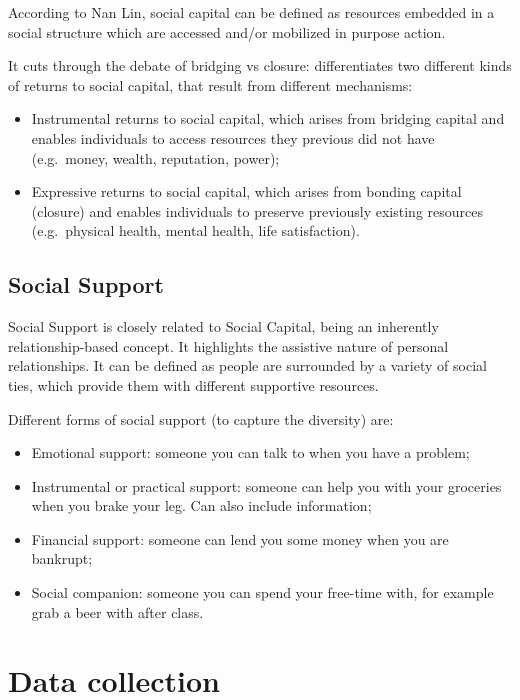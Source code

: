 \documentclass[
  notitlepage,
  onecolumn,
  openany]{book}
\providecommand{\tightlist}{%
  \setlength{\itemsep}{0pt}\setlength{\parskip}{0pt}}
\begin{document}
According to Nan Lin, social capital can be defined as resources embedded in a social structure which are accessed and/or mobilized in purpose action.

It cuts through the debate of bridging vs closure: differentiates two different kinds of returns to social capital, that result from different mechanisms:

\begin{itemize}
\tightlist
\item
  Instrumental returns to social capital, which arises from bridging capital and enables individuals to access resources they previous did not have (e.g.~money, wealth, reputation, power);
\item
  Expressive returns to social capital, which arises from bonding capital (closure) and enables individuals to preserve previously existing resources (e.g.~physical health, mental health, life satisfaction).
\end{itemize}

\hypertarget{social-support}{%
\subsection{Social Support}\label{social-support}}

Social Support is closely related to Social Capital, being an inherently relationship-based concept. It highlights the assistive nature of personal relationships. It can be defined as people are surrounded by a variety of social ties, which provide them with different supportive resources.

Different forms of social support (to capture the diversity) are:

\begin{itemize}
\tightlist
\item
  Emotional support: someone you can talk to when you have a problem;
\item
  Instrumental or practical support: someone can help you with your groceries when you brake your leg. Can also include information;
\item
  Financial support: someone can lend you some money when you are bankrupt;
\item
  Social companion: someone you can spend your free-time with, for example grab a beer with after class.
\end{itemize}

\hypertarget{data-collection}{%
\section{Data collection}\label{data-collection}}
\end{document}

